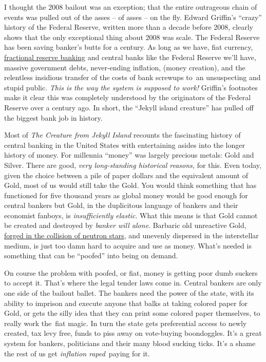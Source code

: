 I thought the 2008 bailout was an exception; that the entire outrageous
chain of events was pulled out of the asses -- of asses -- on the fly.
Edward Griffin's ``crazy'' history of the Federal Reserve, written more
than a decade before 2008, clearly shows that the only exceptional thing
about 2008 was scale. The Federal Reserve has been saving banker's
butts for a century. As long as we have, fiat currency,
\href{http://wiki.mises.org/wiki/Fractional\_reserve\_banking}{fractional
reserve banking} and central banks like the Federal Reserve we'll have,
massive government debts, never-ending inflation, (money creation), and
the relentless insidious transfer of the costs of bank screwups to~an
unsuspecting and stupid public. \emph{This is the way the system is
supposed to work!} Griffin's footnotes make it clear this was completely
understood by the originators of the Federal Reserve over a century ago.
In short, the ``Jekyll island creature'' has pulled off the biggest bank
job in history.

Most of \emph{The Creature from Jekyll Island} recounts the fascinating
history of central banking in the United States with entertaining asides
into the longer history of money. For millennia ``money'' was largely
precious metals: Gold and Silver. There are good, \emph{very
long-standing historical reasons,} for this. Even today, given the
choice between a pile of paper dollars and the equivalent amount of
Gold, most of us would still take the Gold. You would think something
that has functioned for five thousand years as global money would be
good enough for central bankers but Gold, in the duplicitous language of
bankers and their economist fanboys, is \emph{insufficiently elastic}.
What this means is that Gold cannot be created and destroyed by
\emph{banker will alone}. Barbaric old unreactive Gold,
\href{http://www.washingtonpost.com/national/health-science/origin-of-gold-found-in-rare-neutron-star-collisions/2013/07/17/a158bd46-eef2-11e2-bed3-b9b6fe264871\_story.html}{forged
in the collision of neutron stars}, and unevenly dispersed in the
interstellar medium, is just too damn hard to acquire and use as money.
What's needed is something that can be ``poofed'' into being on demand.

On course the problem with poofed, or fiat, money is getting poor dumb
suckers to accept it. That's where the legal tender laws come in.
Central bankers are only one side of the bailout ballet. The bankers
need the power of the state, with its ability to imprison and execute
anyone that balks at taking colored paper for Gold, or gets the silly
idea that they can print some colored paper themselves, to really work
the~fiat magic. In turn the state gets preferential access to newly
created, tax levy free, funds to piss away on vote-buying boondoggles.
It's a great system for bankers, politicians and their many blood
sucking ticks. It's a shame the rest of us get \emph{inflation
raped}~paying for it.

